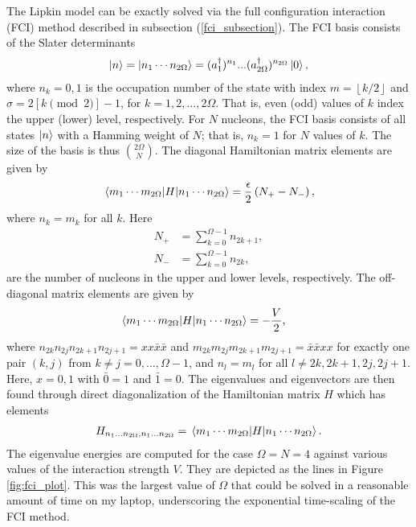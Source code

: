\documentclass[Dual]{msu-thesis}
\begin{document}
The Lipkin model can be exactly solved via the full configuration interaction (FCI) method described in subsection (\ref{fci_subsection}). The FCI basis consists of the Slater determinants
\begin{align}
\ket{n}=\ket{n_1\cdots n_{2\Omega}}=(a^\dagger_1)^{n_1}...(a^\dagger_{2\Omega})^{n_{2\Omega}}\ket{0},
\end{align}
where $n_k=0,1$ is the occupation number of the state with index $m=\left \lfloor{k/2}\right \rfloor$ and $\sigma = 2[k \pmod2]-1$, for $k=1,2,...,2\Omega$. That is, even (odd) values of $k$ index the upper (lower) level, respectively. For $N$ nucleons, the FCI basis consists of all states $\ket{n}$ with a Hamming weight of $N$; that is, $n_k=1$ for $N$ values of $k$. The size of the basis is thus ${2\Omega \choose N}$. The diagonal Hamiltonian matrix elements are given by
\begin{align}
\mel{m_1\cdots m_{2\Omega}}{H}{n_1\cdots n_{2\Omega}}
=
\frac{\epsilon}{2}\left(N_+-N_-\right),
\end{align}
where $n_k=m_k$ for all $k$. Here
\begin{align}
N_+
&=
\sum_{k=0}^{\Omega-1}n_{2k+1},
\\
N_-
&=
\sum_{k=0}^{\Omega-1}n_{2k},
\end{align}
are the number of nucleons in the upper and lower levels, respectively. The off-diagonal matrix elements are given by
\begin{align}
\mel{m_1\cdots m_{2\Omega}}{H}{n_1\cdots n_{2\Omega}}
&=
-\frac{V}{2}
,\end{align}
where $n_{2k}n_{2j}n_{2k+1}n_{2j+1}=xx\bar{x}\bar{x}$ and $m_{2k}m_{2j}m_{2k+1}m_{2j+1}=\bar{x}\bar{x}xx$ for exactly one pair $(k,j)$ from $k\neq j=0,...,\Omega-1$, and $n_l=m_l$ for all $l\neq 2k,2k+1,2j,2j+1$. Here, $x=0,1$ with $\bar{0}=1$ and $\bar{1}=0$. The eigenvalues and eigenvectors are then found through direct diagonalization of the Hamiltonian matrix $H$ which has elements 
\begin{align}
H_{n_1\ldots n_{2\Omega},{n_1\ldots n_{2\Omega}}}=\mel{m_1\cdots m_{2\Omega}}{H}{n_1\cdots n_{2\Omega}}.   
\end{align}
The eigenvalue energies are computed for the case $\Omega=N=4$ against various values of the interaction strength $V$. They are depicted as the lines in Figure \ref{fig:fci_plot}. This was the largest value of $\Omega$ that could be solved in a reasonable amount of time on my laptop, underscoring the exponential time-scaling of the FCI method.
\end{document}
